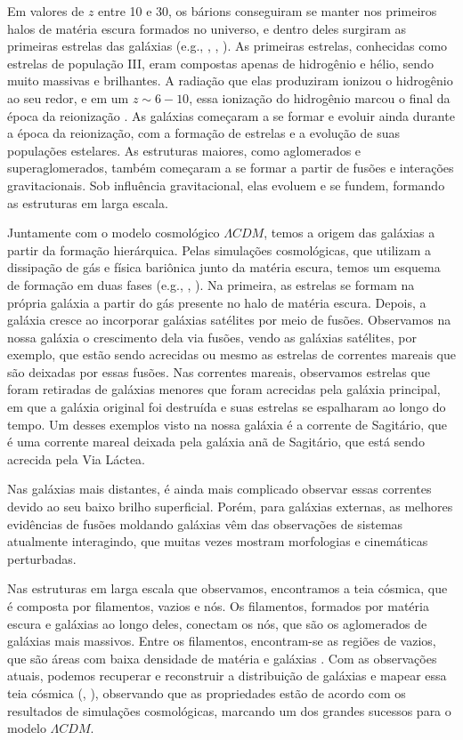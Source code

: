 Em valores de $z$ entre 10 e 30, os bárions conseguiram se manter nos primeiros halos de matéria escura formados no universo, e dentro deles surgiram as primeiras estrelas das galáxias (e.g., \citealp{Glover_2005}, \citealp{Greif_2015}, \citealp{Schauer_2021}). As primeiras estrelas, conhecidas como estrelas de população III, eram compostas apenas de hidrogênio e hélio, sendo muito massivas e brilhantes. A radiação que elas produziram ionizou o hidrogênio ao seu redor, e em um $z \sim 6-10$, essa ionização do hidrogênio marcou o final da época da reionização \citep{Wise_2019}. As galáxias começaram a se formar e evoluir ainda durante a época da reionização, com a formação de estrelas e a evolução de suas populações estelares. As estruturas maiores, como aglomerados e superaglomerados, também começaram a se formar a partir de fusões e interações gravitacionais. Sob influência gravitacional, elas evoluem e se fundem, formando as estruturas em larga escala.

Juntamente com o modelo cosmológico $\Lambda CDM$, temos a origem das galáxias a partir da formação hierárquica. Pelas simulações cosmológicas, que utilizam a dissipação de gás e física bariônica junto da matéria escura, temos um esquema de formação em duas fases (e.g., \citealp{Oser_2010}, \citealp{Pillepich_2014}). Na primeira, as estrelas se formam na própria galáxia a partir do gás presente no halo de matéria escura. Depois, a galáxia cresce ao incorporar galáxias satélites por meio de fusões. Observamos na nossa galáxia o crescimento dela via fusões, vendo as galáxias satélites, por exemplo, que estão sendo acrecidas ou mesmo as estrelas de correntes mareais que são deixadas por essas fusões. Nas correntes mareais, observamos estrelas que foram retiradas de galáxias menores que foram acrecidas pela galáxia principal, em que a galáxia original foi destruída e suas estrelas se espalharam ao longo do tempo. Um desses exemplos visto na nossa galáxia é a corrente de Sagitário, que é uma corrente mareal deixada pela galáxia anã de Sagitário, que está sendo acrecida pela Via Láctea.

Nas galáxias mais distantes, é ainda mais complicado observar essas correntes devido ao seu baixo brilho superficial. Porém, para galáxias externas, as melhores evidências de fusões moldando galáxias vêm das observações de sistemas atualmente interagindo, que muitas vezes mostram morfologias e cinemáticas perturbadas.

Nas estruturas em larga escala que observamos, encontramos a teia cósmica, que é composta por filamentos, vazios e nós. Os filamentos, formados por matéria escura e galáxias ao longo deles, conectam os nós, que são os aglomerados de galáxias mais massivos. Entre os filamentos, encontram-se as regiões de vazios, que são áreas com baixa densidade de matéria e galáxias \citep{Lindner_1995}. Com as observações atuais, podemos recuperar e reconstruir a distribuição de galáxias e mapear essa teia cósmica (\citealp{Lindner_1995}, \citealp{Abazajian_2003}), observando que as propriedades estão de acordo com os resultados de simulações cosmológicas, marcando um dos grandes sucessos para o modelo $\Lambda CDM$.

